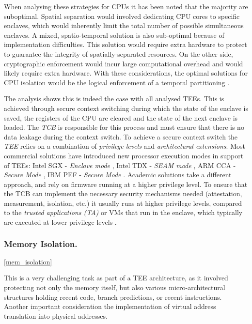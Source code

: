 \documentclass[runningheads,a4paper]{uwsese}
\begin{document}
When analysing these strategies for CPUs it has been noted that the majority
are suboptimal. Spatial separation would involved dedicating CPU cores to
specific enclaves, which would inherently limit the total number of possible
simultaneous enclaves. A mixed, spatio-temporal solution is also sub-optimal
because of implementation difficulties. This solution would require extra
hardware to protect to guarantee the integrity of spatially-separated
resources. On the other side, cryptographic enforcement would incur large
computational overhead and would likely require extra hardware. With these
considerations, the optimal solutions for CPU isolation would be the logical
enforcement of a temporal partitioning \cite{tee_hw_sup}.

The analysis shows this is indeed the case with all analysed TEEs. This is
achieved through secure context switching during which the state of the enclave
is saved, the registers of the CPU are cleared and the state of the next
enclave is loaded. The \emph{TCB} is responsible for this process and must
ensure that there is no data leakage during the context switch. To achieve a
secure context switch the \emph{TEE} relies on a combination of \emph{privilege
levels} and \emph{architectural extensions}. Most commercial solutions have
introduced new processor execution modes in support of TEEs: Intel SGX -
\emph{Enclave mode} \cite{intel_sgx}, Intel TDX - \emph{SEAM mode}
\cite{intel_tdx}, ARM CCA - \emph{Secure Mode} \cite{arm_cca}, IBM PEF -
\emph{Secure Mode} \cite{ibm_pef}. Academic solutions take a different
approach, and rely on firmware running at a higher privilege level. To ensure
that the TCB can implement the necessary security mechanisms needed
(attestation, measurement, isolation, etc.) it usually runs at higher privilege
levels, compared to the \emph{trusted applications (TA)} or VMs that run in the
enclave, which typically are executed at lower privilege levels
\cite{tee_hw_sup}. 

\subsubsection{Memory Isolation.}
\ref{mem_isolation}

This is a very challenging task as part of a TEE architecture, as it involved
protecting not only the memory itself, but also various micro-architectural
structures holding recent code, branch predictions, or recent instructions.
Another important consideration the implementation of virtual address
translation into physical addresses.
\end{document}
